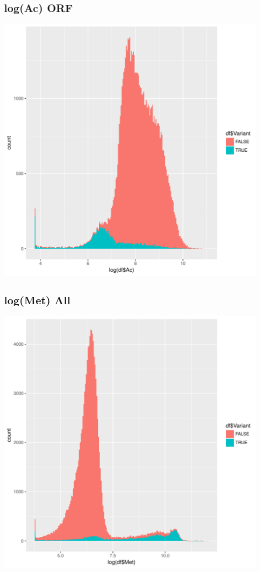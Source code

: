 \documentclass{article}\usepackage[]{graphicx}\usepackage[]{color}
\newenvironment{knitrout}{}{} %
\begin{document}
\subsection{log(Ac) ORF}
\begin{knitrout}
\color{fgcolor}
\includegraphics[width=1\linewidth]{figure/dens_ORF-1} 

\end{knitrout}
\clearpage
\subsection{log(Met) All}
\begin{knitrout}
\color{fgcolor}
\includegraphics[width=1\linewidth]{figure/dens_all_met-1} 

\end{knitrout}
\clearpage
\end{document}
